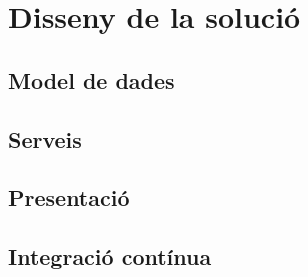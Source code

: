 
\chapter{Disseny de la solució}\label{estructura}

\section{Model de dades}

\section{Serveis}

\section{Presentació}
	
\section{Integració contínua}



